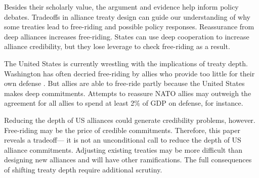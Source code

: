 \documentclass[12pt]{article}
\begin{document}
Besides their scholarly value, the argument and evidence help inform policy debates. 
Tradeoffs in alliance treaty design can guide our understanding of why some treaties lead to free-riding and possible policy responses. 
Reassurance from deep alliances increases free-riding. 
States can use deep cooperation to increase alliance credibility, but they lose leverage to check free-riding as a result. 


The United States is currently wrestling with the implications of treaty depth. 
Washington has often decried free-riding by allies who provide too little for their own defense \citep{Lanoszka2015}. 
But allies are able to free-ride partly because the United States makes deep commitments. 
Attempts to reassure NATO allies may outweigh the agreement for all allies to spend at least 2\% of GDP on defense, for instance.


Reducing the depth of US alliances could generate credibility problems, however. 
Free-riding may be the price of credible commitments.  
Therefore, this paper reveals a tradeoff--- it is not an unconditional call to reduce the depth of US alliance commitments. 
Adjusting existing treaties may be more difficult than designing new alliances and will have other ramifications. 
The full consequences of shifting treaty depth require additional scrutiny. 

 



 
 
\end{document}

